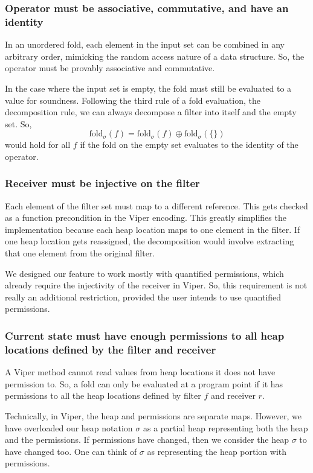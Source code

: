 \documentclass[msc,oneside]{ubcthesis}
\begin{document}
\subsubsection{Operator must be associative, commutative, and have an identity}
In an unordered fold, each element in the input set can be combined in any arbitrary order, mimicking the random access nature of a data structure. So, the operator must be provably associative and commutative. 

In the case where the input set is empty, the fold must still be evaluated to a value for soundness. Following the third rule of a fold evaluation, \ie the decomposition rule, we can always decompose a filter into itself and the empty set. So,
$$\textrm{fold}_{\sigma}(f) = \textrm{fold}_{\sigma}(f) \oplus \textrm{fold}_{\sigma}(\{\})$$ would hold for all $f$ if the fold on the empty set evaluates to the identity of the operator. 

\subsubsection{Receiver must be injective on the filter}
Each element of the filter set must map to a different reference. This gets checked as a function precondition in the Viper encoding. This greatly simplifies the implementation because each heap location maps to one element in the filter. If one heap location gets reassigned, the decomposition would involve extracting that one element from the original filter.

We designed our feature to work mostly with quantified permissions, which already require the injectivity of the receiver in Viper. So, this requirement is not really an additional restriction, provided the user intends to use quantified permissions.

\subsubsection{Current state must have enough permissions to all heap locations defined by the filter and receiver}
A Viper method cannot read values from heap locations it does not have permission to. So, a fold can only be evaluated at a program point if it has permissions to all the heap locations defined by filter $f$ and receiver $r$.

Technically, in Viper, the heap and permissions are separate maps. However, we have overloaded our heap notation $\sigma$ as a partial heap representing both the heap and the permissions. If permissions have changed, then we consider the heap $\sigma$ to have changed too. One can think of $\sigma$ as representing the heap portion with permissions.
\end{document}
